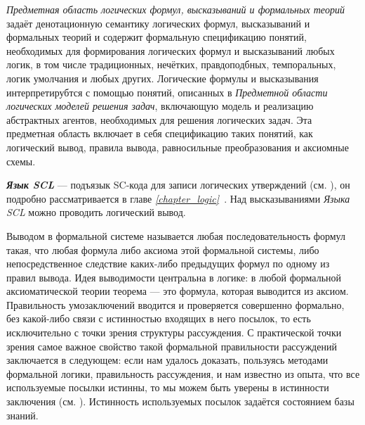 \textit{Предметная область логических формул, высказываний и формальных теорий} задаёт денотационную семантику логических формул, высказываний и формальных теорий и содержит формальную спецификацию понятий, необходимых для формирования логических формул и высказываний любых логик, в том числе традиционных, нечётких, правдоподбных, темпоральных, логик умолчания и любых других. Логические формулы и высказывания интерпретирубтся с помощью понятий, описанных в \textit{Предметной области логических моделей решения задач}, включающую модель и реализацию абстрактных агентов, необходимых для решения логических задач. Эта предметная область включает в себя спецификацию таких понятий, как логический вывод, правила вывода, равносильные преобразования и аксиомные схемы.

\textit{\textbf{Язык SCL}} — подъязык SC-кода для записи логических утверждений (см. \textit{}), он подробно рассматривается в главе \textit{\ref{chapter_logic}~}. Над высказываниями \textit{Языка SCL} можно проводить логический вывод.

Выводом в формальной системе называется любая последовательность формул такая, что любая формула либо аксиома этой формальной системы, либо непосредственное следствие каких-либо предыдущих формул по одному из правил вывода. Идея выводимости центральна в логике: в любой формальной аксиоматической теории теорема --- это формула, которая выводится из аксиом. Правильность умозаключений вводится и проверяется совершенно формально, без какой-либо связи с истинностью входящих в него посылок, то есть исключительно с точки зрения структуры рассуждения. С практической точки зрения самое важное свойство такой формальной правильности рассуждений заключается в следующем: если нам удалось доказать, пользуясь методами формальной логики, правильность рассуждения, и нам известно из опыта, что все используемые посылки истинны, то мы можем быть уверены в истинности заключения (см. \textit{}). Истинность используемых посылок задаётся состоянием базы знаний.

